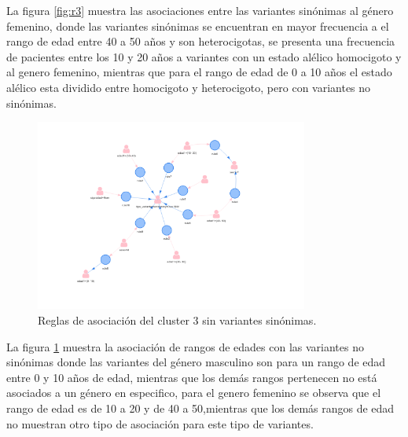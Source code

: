 La figura \ref{fig:r3} muestra las asociaciones entre las variantes sinónimas al género femenino, donde las variantes sinónimas se encuentran en mayor frecuencia a el rango de edad entre 40 a 50 años y son heterocigotas, se presenta una frecuencia de pacientes entre los 10 y 20 años a variantes con un estado alélico homocigoto y al genero femenino, mientras que para el rango de edad de 0 a 10 años el estado alélico esta dividido entre homocigoto y heterocigoto, pero con variantes no sinónimas.

\begin{figure}[H]
	\centering
	\includegraphics[width=0.8\textwidth]{Kap4/reglas3_2}
	\caption{Reglas de asociación del cluster 3 sin variantes sinónimas.} \label{fig:re3}
\end{figure}

La figura \ref{fig:re3} muestra la asociación de rangos de edades con las variantes no sinónimas donde las variantes del género masculino son para un rango de edad entre 0 y 10 años de edad, mientras que los demás rangos pertenecen no está asociados a un género en especifico, para el genero femenino se observa que el rango de edad es de 10 a 20 y de 40 a 50,mientras que los demás rangos de edad no muestran otro tipo de asociación para este tipo de variantes.  

